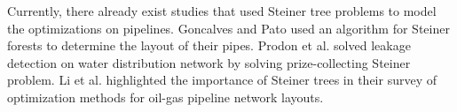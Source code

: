 Currently, there already exist studies that used Steiner tree problems to model the optimizations on pipelines. Goncalves and Pato \cite{Goncalves2000} used an algorithm for Steiner forests to determine the layout of their pipes. Prodon et al. \cite{Prodon2010} solved leakage detection on water distribution network by solving prize-collecting Steiner problem. Li et al. \cite{Li2015} highlighted the importance of Steiner trees in their survey of optimization methods for oil-gas pipeline network layouts.